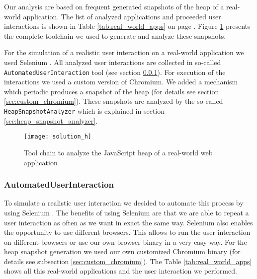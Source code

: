 Our analysis are based on frequent generated snapshots of the \JS heap of a real-world application. The list of analyzed applications and proceeded user interactions is shown in Table \ref{tab:real_world_apps} on page \pageref{tab:real_world_apps}.
Figure \ref{fig:heap_structure_analysis} presents the complete toolchain we used to generate and analyze these snapshots. 

For the simulation of a realistic user interaction on a real-world application we used Selenium \cite{Selenium}. All analyzed user interactions are collected in so-called \texttt{AutomatedUserInteraction} tool (see section \ref{sec:automated_user_interaction}). For execution of the interactions we used a custom version of Chromium. We added a mechanism which periodic produces a snapshot of the \JS heap (for details see section \ref{sec:custom_chromium}). These snapshots are analyzed by the so-called \texttt{HeapSnapshotAnalyzer} which is explained in section \ref{sec:heap_snapshot_analyzer}.

\begin{figure}
	\centering
	\texttt{[image: solution\_h]}
	\caption{Tool chain to analyze the JavaScript heap of a real-world web application}
	\label{fig:heap_structure_analysis}
\end{figure}
	
\subsubsection{AutomatedUserInteraction} \label{sec:automated_user_interaction}
To simulate a realistic user interaction we decided to automate this process by using Selenium \cite{Selenium}. The benefits of using Selenium are that we are able to repeat a user interaction as often as we want in exact the same way. Selenium also enables the opportunity to use different browsers. This allows to run the user interaction on different browsers or use our own browser binary in a very easy way. For the heap snapshot generation we used our own customized Chromium binary (for details see subsection \ref{sec:custom_chromium}). The Table \ref{tab:real_world_apps} shows all this real-world applications and the user interaction we performed. 

